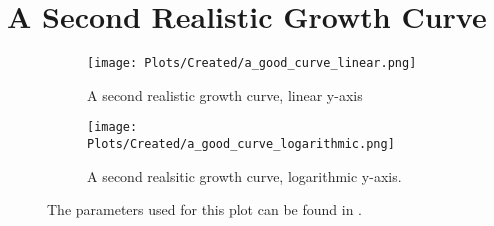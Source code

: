 \section{A Second Realistic Growth Curve}
\label{sec:appendixE:a_good_curve_2}

\begin{figure}[ht!]
    \centering
    \begin{subfigure}{1\linewidth}
        \centering
        \captionsetup{width=1\linewidth}
        \texttt{[image: Plots/Created/a\_good\_curve\_linear.png]}
        \caption{
            A second realistic growth curve, linear y-axis
        }
        \label{fig:created:a_good_curve_linear_2}
    \end{subfigure}
    \hfill
    \begin{subfigure}{1\linewidth}
        \centering
        \captionsetup{width=1\linewidth}
        \texttt{[image: Plots/Created/a\_good\_curve\_logarithmic.png]}
        \caption{
            A second realsitic growth curve, logarithmic y-axis. 
        }
        \label{fig:created:a_good_curve_logarithmic_2}
    \end{subfigure}
    \caption{
        The parameters used for this plot can be found in . 
    }
    \label{fig:created:a_good_curve_2}
\end{figure}

